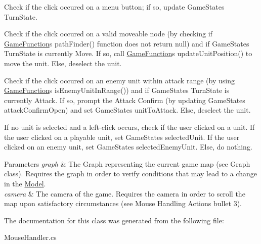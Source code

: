 \begin{DoxyItemize}
\begin{DoxyEnumerate}
\item Check if the click occured on a menu button; if so, update Game\+State\textquotesingle{}s Turn\+State. ~\newline

\item Check if the click occured on a valid moveable node (by checking if \hyperlink{class_controller_1_1_game_function}{Game\+Function}\textquotesingle{}s path\+Finder() function does not return null) and if Game\+State\textquotesingle{}s Turn\+State is currently Move. If so, call \hyperlink{class_controller_1_1_game_function}{Game\+Function}\textquotesingle{}s update\+Unit\+Position() to move the unit. Else, deselect the unit. ~\newline

\item Check if the click occured on an enemy unit within attack range (by using \hyperlink{class_controller_1_1_game_function}{Game\+Function}\textquotesingle{}s is\+Enemy\+Unit\+In\+Range()) and if Game\+State\textquotesingle{}s Turn\+State is currently Attack. If so, prompt the Attack Confirm (by updating Game\+State\textquotesingle{}s attack\+Confirm\+Open) and set Game\+State\textquotesingle{}s unit\+To\+Attack. Else, deselect the unit. ~\newline

\end{DoxyEnumerate}
\item If no unit is selected and a left-\/click occurs, check if the user clicked on a unit. If the user clicked on a playable unit, set Game\+State\textquotesingle{}s selected\+Unit. If the user clicked on an enemy unit, set Game\+State\textquotesingle{}s selected\+Enemy\+Unit. Else, do nothing. 
\begin{DoxyParams}{Parameters}
{\em graph} & The Graph representing the current game map (see Graph class). Requires the graph in order to verify conditions that may lead to a change in the \hyperlink{namespace_model}{Model}. \\
\hline
{\em camera} & The camera of the game. Requires the camera in order to scroll the map upon satisfactory circumstances (see Mouse Handling Actions bullet 3). \\
\hline
\end{DoxyParams}

\end{DoxyItemize}

The documentation for this class was generated from the following file\+:\begin{DoxyCompactItemize}
\item 
Mouse\+Handler.\+cs\end{DoxyCompactItemize}
